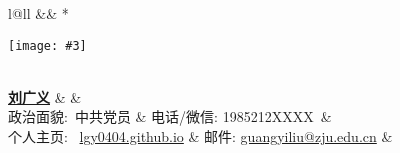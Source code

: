 \newcommand{\paint}[3]{
    \begin{minipage}{#1}
        \texttt{[image: \#3]}
    \end{minipage} 
}
\newcommand{\myheader}{
\begin{tabular*}{\textwidth}{l@{\extracolsep{\fill}}ll}
  && \multirow{4}*{\paint{2.5cm}{3.5cm}{./刘广义-蓝底-1寸.jpg}}\\
  \specialrule{0em}{4pt}{4pt}
  \textbf{\href{}{\LARGE 刘广义}} &  &\\

  
  政治面貌: $\,${中共党员} &  电话/微信: 1985212XXXX$\,${\color{labelgrey}}
  & \\
  个人主页:  $\,${  \href{https://lgy0404.github.io/}{lgy0404.github.io} } & 邮件: \href{mailto:guangyiliu@zju.edu.cn}{guangyiliu@zju.edu.cn} 
 & \\
  \end{tabular*}\\\vspace{0.1in}

}

\myheader

